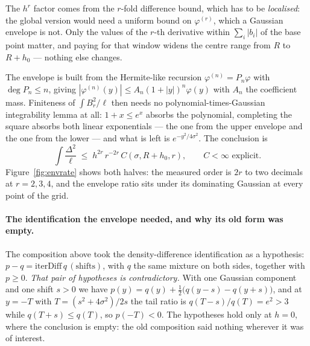 The $h^{r}$ factor comes from the $r$-fold difference bound, which has to be
\emph{localised}: the global version would need a uniform bound on $\varphi^{(r)}$, which a
Gaussian envelope is not. Only the values of the $r$-th derivative within
$\sum_{i}|b_{i}|$ of the base point matter, and paying for that window widens the centre
range from $R$ to $R+h_{0}$ --- nothing else changes.

The envelope is built from the Hermite-like recursion $\varphi^{(n)}=P_{n}\varphi$ with
$\deg P_{n}\le n$, giving $|\varphi^{(n)}(y)|\le A_{n}(1+|y|)^{n}\varphi(y)$ with $A_{n}$
the coefficient mass. Finiteness of $\int B_{r}^{2}/\ell$ then needs no
polynomial-times-Gaussian integrability lemma at all: $1+x\le e^{x}$ absorbs the
polynomial, completing the square absorbs both linear exponentials --- the one from the
upper envelope and the one from the lower --- and what is left is $e^{-y^{2}/4\sigma^{2}}$.
The conclusion is
\[
\int \frac{\Delta^{2}}{\ell}\;\le\;h^{2r}\,r^{-2r}\,C(\sigma,R+h_{0},r),
\qquad C<\infty \text{ explicit.}
\]
Figure~\ref{fig:envrate} shows both halves: the measured order is $2r$ to two decimals at
$r=2,3,4$, and the envelope ratio sits under its dominating Gaussian at every point of the
grid. \NUM{}


\paragraph{The identification the envelope needed, and why its old form was empty.}
The composition above took the density-difference identification as a hypothesis:
$p-q=\mathrm{iterDiff}\,q\,(\text{shifts})$, with $q$ the same mixture on both sides,
together with $p\ge0$. \emph{That pair of hypotheses is contradictory.} With one Gaussian
component and one shift $s>0$ we have $p(y)=q(y)+\tfrac12\bigl(q(y-s)-q(y+s)\bigr)$, and at
$y=-T$ with $T=(s^{2}+4\sigma^{2})/2s$ the tail ratio is $q(T-s)/q(T)=e^{2}>3$ while
$q(T+s)\le q(T)$, so $p(-T)<0$. The hypotheses hold only at $h=0$, where the conclusion is
empty: the old composition said nothing wherever it was of interest.


